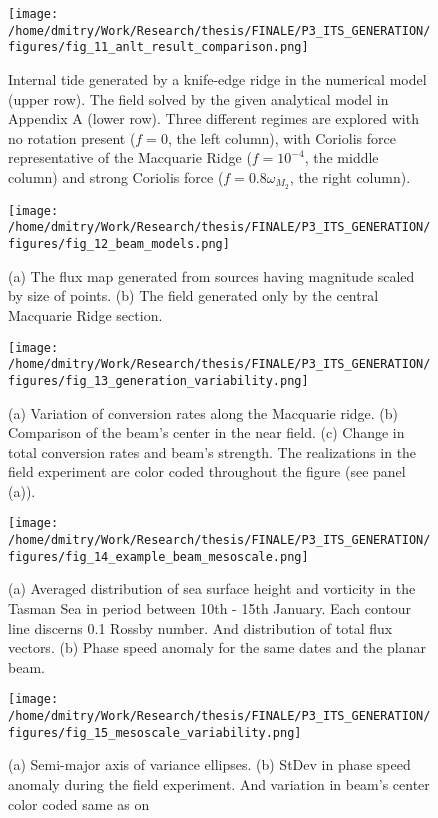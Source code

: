 \documentclass[12pt]{article}
\begin{document}
\begin{figure}
	\centering
	\texttt{[image: /home/dmitry/Work/Research/thesis/FINALE/P3\_ITS\_GENERATION/figures/fig\_11\_anlt\_result\_comparison.png]}
	\caption{Internal tide generated by a knife-edge ridge in the numerical model (upper row). The 
	field solved by the given analytical model in Appendix A (lower row). Three different regimes 
	are explored with no rotation present ($f = 0$, the left column), with Coriolis force 
	representative of the Macquarie Ridge ($f = 10^{-4}$, the middle column) and strong Coriolis 
	force ($f = 0.8 \omega_{M_2}$, the right column).}
	\label{C3.fig:anlt_sol}
\end{figure}

\begin{figure}
	\centering
	\texttt{[image: /home/dmitry/Work/Research/thesis/FINALE/P3\_ITS\_GENERATION/figures/fig\_12\_beam\_models.png]}
	\caption{(a) The flux map generated from sources having magnitude scaled by size of points. (b) 
	The field generated only by the central Macquarie Ridge section.}
	\label{C3.fig:beam_inv}
\end{figure}

\begin{figure}
	\centering
	\texttt{[image: /home/dmitry/Work/Research/thesis/FINALE/P3\_ITS\_GENERATION/figures/fig\_13\_generation\_variability.png]}
	\caption{(a) Variation of conversion rates along the Macquarie ridge. (b) Comparison of the 
	beam's center in the near field. (c) Change in total conversion rates and beam's strength. The 
	realizations in the field experiment are color coded throughout the figure (see panel (a)).}
	\label{C3.fig:gen_var_beam}
\end{figure}

\begin{figure}
	\centering
	\texttt{[image: /home/dmitry/Work/Research/thesis/FINALE/P3\_ITS\_GENERATION/figures/fig\_14\_example\_beam\_mesoscale.png]}
	\caption{(a) Averaged distribution of sea surface height and vorticity in the Tasman Sea in 
	period between 10th - 15th January. Each contour line discerns 0.1 Rossby number. And 	
	distribution of total flux vectors. (b) Phase speed anomaly for the same dates and the planar 
	beam.}
	\label{C3.fig:meso_examp}
\end{figure}

\begin{figure}
	\centering
	\texttt{[image: /home/dmitry/Work/Research/thesis/FINALE/P3\_ITS\_GENERATION/figures/fig\_15\_mesoscale\_variability.png]}
	\caption{(a) Semi-major axis of variance ellipses. (b) StDev in phase speed anomaly during the 	
	field experiment. And variation in beam's center color coded same as on 
	}
	\label{C3.fig:var_meso}
\end{figure}
\end{document}
